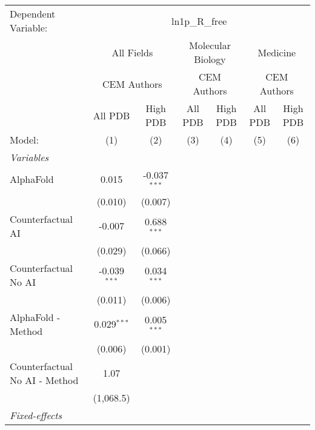 \begingroup
\centering
\begin{tabular}{lcccccc}
   \tabularnewline \midrule \midrule
   Dependent Variable: & \multicolumn{6}{c}{ln1p\_R\_free}\\
 & \multicolumn{2}{c}{All Fields} & \multicolumn{2}{c}{Molecular Biology} & \multicolumn{2}{c}{Medicine} \\
\cmidrule(lr){2-3} \cmidrule(lr){4-5} \cmidrule(lr){6-7}
 & \multicolumn{2}{c}{CEM Authors} & \multicolumn{2}{c}{CEM Authors} & \multicolumn{2}{c}{CEM Authors} \\
\cmidrule(lr){2-3} \cmidrule(lr){4-5} \cmidrule(lr){6-7}
 & \multicolumn{1}{c}{All PDB} & \multicolumn{1}{c}{High PDB} & \multicolumn{1}{c}{All PDB} & \multicolumn{1}{c}{High PDB} & \multicolumn{1}{c}{All PDB} & \multicolumn{1}{c}{High PDB} \\
\cmidrule(lr){2-2} \cmidrule(lr){3-3} \cmidrule(lr){4-4} \cmidrule(lr){5-5} \cmidrule(lr){6-6} \cmidrule(lr){7-7}
   Model:                        & (1)            & (2)            & (3) & (4) & (5) & (6)\\  
   \midrule
   \emph{Variables}\\
   AlphaFold                     & 0.015          & -0.037$^{***}$ &     &     &     &   \\   
                                 & (0.010)        & (0.007)        &     &     &     &   \\   
   Counterfactual AI             & -0.007         & 0.688$^{***}$  &     &     &     &   \\   
                                 & (0.029)        & (0.066)        &     &     &     &   \\   
   Counterfactual No AI          & -0.039$^{***}$ & 0.034$^{***}$  &     &     &     &   \\   
                                 & (0.011)        & (0.006)        &     &     &     &   \\   
   AlphaFold - Method            & 0.029$^{***}$  & 0.005$^{***}$  &     &     &     &   \\   
                                 & (0.006)        & (0.001)        &     &     &     &   \\   
   Counterfactual No AI - Method & 1.07           &                &     &     &     &   \\   
                                 & (1,068.5)      &                &     &     &     &   \\   
   \midrule
   \emph{Fixed-effects}\\

\end{tabular}
